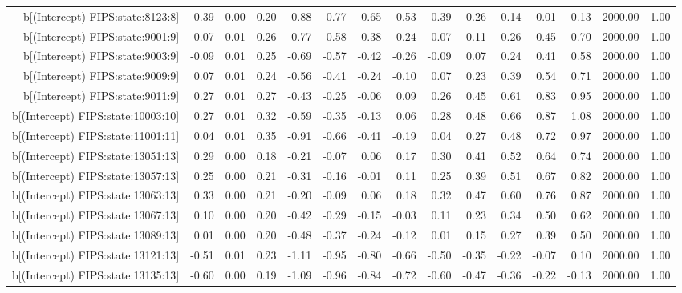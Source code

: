 \begin{table}[ht]
\begin{tabular}{rrrrrrrrrrrrrrr}
  b[(Intercept) FIPS:state:8123:8] & -0.39 & 0.00 & 0.20 & -0.88 & -0.77 & -0.65 & -0.53 & -0.39 & -0.26 & -0.14 & 0.01 & 0.13 & 2000.00 & 1.00 \\ 
  b[(Intercept) FIPS:state:9001:9] & -0.07 & 0.01 & 0.26 & -0.77 & -0.58 & -0.38 & -0.24 & -0.07 & 0.11 & 0.26 & 0.45 & 0.70 & 2000.00 & 1.00 \\ 
  b[(Intercept) FIPS:state:9003:9] & -0.09 & 0.01 & 0.25 & -0.69 & -0.57 & -0.42 & -0.26 & -0.09 & 0.07 & 0.24 & 0.41 & 0.58 & 2000.00 & 1.00 \\ 
  b[(Intercept) FIPS:state:9009:9] & 0.07 & 0.01 & 0.24 & -0.56 & -0.41 & -0.24 & -0.10 & 0.07 & 0.23 & 0.39 & 0.54 & 0.71 & 2000.00 & 1.00 \\ 
  b[(Intercept) FIPS:state:9011:9] & 0.27 & 0.01 & 0.27 & -0.43 & -0.25 & -0.06 & 0.09 & 0.26 & 0.45 & 0.61 & 0.83 & 0.95 & 2000.00 & 1.00 \\ 
  b[(Intercept) FIPS:state:10003:10] & 0.27 & 0.01 & 0.32 & -0.59 & -0.35 & -0.13 & 0.06 & 0.28 & 0.48 & 0.66 & 0.87 & 1.08 & 2000.00 & 1.00 \\ 
  b[(Intercept) FIPS:state:11001:11] & 0.04 & 0.01 & 0.35 & -0.91 & -0.66 & -0.41 & -0.19 & 0.04 & 0.27 & 0.48 & 0.72 & 0.97 & 2000.00 & 1.00 \\ 
  b[(Intercept) FIPS:state:13051:13] & 0.29 & 0.00 & 0.18 & -0.21 & -0.07 & 0.06 & 0.17 & 0.30 & 0.41 & 0.52 & 0.64 & 0.74 & 2000.00 & 1.00 \\ 
  b[(Intercept) FIPS:state:13057:13] & 0.25 & 0.00 & 0.21 & -0.31 & -0.16 & -0.01 & 0.11 & 0.25 & 0.39 & 0.51 & 0.67 & 0.82 & 2000.00 & 1.00 \\ 
  b[(Intercept) FIPS:state:13063:13] & 0.33 & 0.00 & 0.21 & -0.20 & -0.09 & 0.06 & 0.18 & 0.32 & 0.47 & 0.60 & 0.76 & 0.87 & 2000.00 & 1.00 \\ 
  b[(Intercept) FIPS:state:13067:13] & 0.10 & 0.00 & 0.20 & -0.42 & -0.29 & -0.15 & -0.03 & 0.11 & 0.23 & 0.34 & 0.50 & 0.62 & 2000.00 & 1.00 \\ 
  b[(Intercept) FIPS:state:13089:13] & 0.01 & 0.00 & 0.20 & -0.48 & -0.37 & -0.24 & -0.12 & 0.01 & 0.15 & 0.27 & 0.39 & 0.50 & 2000.00 & 1.00 \\ 
  b[(Intercept) FIPS:state:13121:13] & -0.51 & 0.01 & 0.23 & -1.11 & -0.95 & -0.80 & -0.66 & -0.50 & -0.35 & -0.22 & -0.07 & 0.10 & 2000.00 & 1.00 \\ 
  b[(Intercept) FIPS:state:13135:13] & -0.60 & 0.00 & 0.19 & -1.09 & -0.96 & -0.84 & -0.72 & -0.60 & -0.47 & -0.36 & -0.22 & -0.13 & 2000.00 & 1.00 \\ 

\end{tabular}
\end{table}
